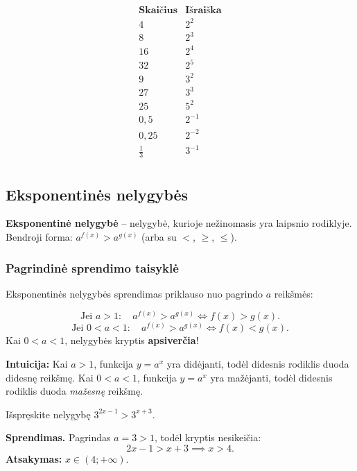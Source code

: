 \[
\begin{array}{c|c}
    \textbf{Skaičius} & \textbf{Išraiška} \\
    \hline
    4 & 2^2 \\
    8 & 2^3 \\
    16 & 2^4 \\
    32 & 2^5 \\
    9 & 3^2 \\
    27 & 3^3 \\
    25 & 5^2 \\
    0{,}5 & 2^{-1} \\
    0{,}25 & 2^{-2} \\
    \tfrac{1}{3} & 3^{-1} \\
\end{array}
\]

\subsection{Eksponentinės nelygybės}

\begin{definition}
\textbf{Eksponentinė nelygybė} – nelygybė, kurioje nežinomasis yra laipsnio rodiklyje.
Bendroji forma: $a^{f(x)} > a^{g(x)}$ (arba su $<$, $\geq$, $\leq$).
\end{definition}

\subsubsection*{Pagrindinė sprendimo taisyklė}

Eksponentinės nelygybės sprendimas priklauso nuo pagrindo $a$ reikšmės:

\begin{tcolorbox}[title={Eksponentinės nelygybės savybės}]
\[
    \text{Jei } a > 1: \quad a^{f(x)} > a^{g(x)} \iff f(x) > g(x).
\]
\[
    \text{Jei } 0 < a < 1: \quad a^{f(x)} > a^{g(x)} \iff f(x) < g(x).
\]
Kai $0 < a < 1$, nelygybės kryptis \textbf{apsiverčia}!
\end{tcolorbox}

\textbf{Intuicija:} Kai $a > 1$, funkcija $y = a^x$ yra didėjanti, todėl didesnis
rodiklis duoda didesnę reikšmę. Kai $0 < a < 1$, funkcija $y = a^x$ yra mažėjanti,
todėl didesnis rodiklis duoda \emph{mažesnę} reikšmę.

\begin{example}
Išspręskite nelygybę $3^{2x-1} > 3^{x+3}$.

\textbf{Sprendimas.} Pagrindas $a = 3 > 1$, todėl kryptis nesikeičia:
\[
    2x - 1 > x + 3 \implies x > 4.
\]
\textbf{Atsakymas:} $x \in (4; +\infty)$.
\end{example}

